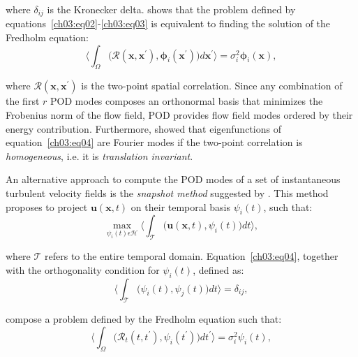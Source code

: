 \noindent where $\delta_{ij}$ is the Kronecker delta.
\citet{holmes2012turbulence} shows that the problem defined by equations~\ref{ch03:eq02}-\ref{ch03:eq03} is equivalent to finding the solution of the Fredholm equation:
\begin{equation}
  \biggl\langle\int_{\Omega} \bigl(\mathcal{R}(\boldsymbol{x},\boldsymbol{x}^{\prime}), \boldsymbol{\phi}_i(\boldsymbol{x^{\prime}})\bigl)d\boldsymbol{x^{\prime}}\biggl\rangle=\sigma_i^2\boldsymbol{\phi}_i(\boldsymbol{x}),
  \label{ch03:eq04}
\end{equation}

\noindent where $\mathcal{R}(\boldsymbol{x},\boldsymbol{x}^{\prime})$ is the two-point spatial correlation.
Since any combination of the first $r$ POD modes composes an orthonormal basis that minimizes the Frobenius norm of the flow field, POD provides flow field modes ordered by their energy contribution.
Furthermore, \citet{holmes2012turbulence} showed that eigenfunctions of equation~\ref{ch03:eq04} are Fourier modes if the two-point correlation is \textit{homogeneous}, i.e. it is \textit{translation invariant}.

An alternative approach to compute the POD modes of a set of instantaneous turbulent velocity fields is the \textit{snapshot method} suggested by \citet{sirovich1987turbulence}.
This method proposes to project $\boldsymbol{u}(\boldsymbol{x}, t)$ on their temporal basis $\psi_i(t)$, such that:
\begin{equation}
  \max_{\psi_i(t)\epsilon\mathcal{H}}\biggl\langle\int_{\mathcal{T}} \bigl(\boldsymbol{u}(\boldsymbol{x}, t), \psi_i(t)\bigl)dt\biggl\rangle,
  \label{ch03:eq05}
\end{equation}

\noindent where $\mathcal{T}$ refers to the entire temporal domain.
Equation~\ref{ch03:eq04}, together with the orthogonality condition for $\psi_i(t)$, defined as:
\begin{equation}
  \biggl\langle\int_{\mathcal{T}} \bigl(\psi_i(t), \psi_j(t)\bigl)dt\biggl\rangle=\delta_{ij},
  \label{ch03:eq06}
\end{equation}

\noindent compose a problem defined by the Fredholm equation such that:
\begin{equation}
  \biggl\langle\int_{\Omega} \bigl(\mathcal{R}_t(t,t^{\prime}), \psi_i(t^{\prime})\bigl)dt^{\prime}\biggl\rangle=\sigma_i^2\psi_i(t),
  \label{ch03:eq07}
\end{equation}

